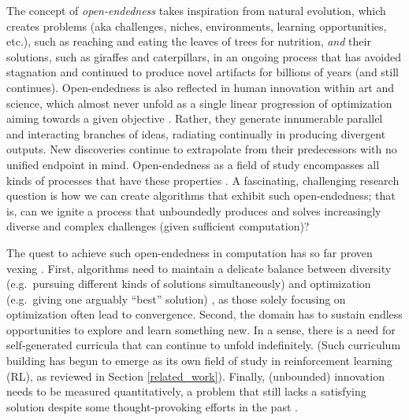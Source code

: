 \documentclass{article}
\begin{document}
The concept of \emph{open-endedness} takes inspiration from natural evolution, which creates problems (aka challenges, niches, environments, learning opportunities, etc.), such as reaching and eating the leaves of trees for nutrition, \emph{and} their solutions, such as giraffes and caterpillars, in an ongoing process that has avoided stagnation and continued to produce novel artifacts for billions of years (and still continues). Open-endedness is also reflected in human innovation within art and science, which almost never unfold as a single linear progression of optimization aiming towards a given objective \cite{stanley:book15}. Rather, they
generate innumerable parallel and interacting branches of ideas, radiating continually in producing divergent outputs. New discoveries continue to extrapolate from their predecessors with no unified endpoint in mind. 
Open-endedness as a field of study encompasses all kinds of processes that have these properties \cite{stanley2017open,taylor:alife16}. A fascinating, challenging research question is how we can create algorithms that exhibit such open-endedness; that is, can we ignite a process that unboundedly produces and solves increasingly diverse and complex challenges (given sufficient computation)? 

The quest to achieve such open-endedness in computation has so far proven vexing \cite{taylor:alife16,dolson2018what}. First, algorithms need to maintain a delicate balance between diversity (e.g.\ pursuing different kinds of solutions simultaneously) and optimization (e.g.\ giving one arguably ``best'' solution) \cite{brant:mcc17,soros:alife14,pugh:frontiers16,lehman:gecco11, mouret:arxiv15}, as those solely focusing on optimization often lead to convergence. Second, the domain has to sustain endless opportunities to explore and learn something new. In a sense, there is a need for self-generated curricula that can continue to unfold indefinitely. (Such curriculum building has begun to emerge as its own field of study in reinforcement learning (RL), as reviewed in Section \ref{related_work}). Finally, (unbounded) innovation needs to be measured quantitatively, a problem that still lacks a satisfying solution despite some thought-provoking efforts in the past \cite{bedau:alife92}.
\end{document}
